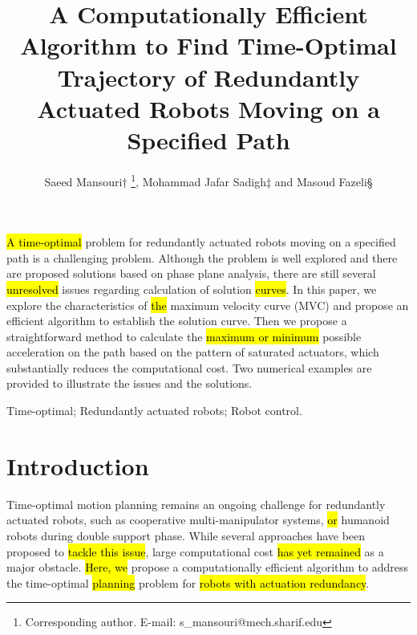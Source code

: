 \documentclass{rob}%
\begin{document}
	
	\title[Time-Optimal Trajectory of Redundantly Actuated Robots]{A Computationally Efficient Algorithm to Find Time-Optimal Trajectory of Redundantly Actuated Robots Moving on a Specified Path}
	
	\author{Saeed Mansouri$\dagger$ \thanks{Corresponding author. E-mail: s\_mansouri@mech.sharif.edu}, Mohammad Jafar Sadigh$\ddagger$ and Masoud Fazeli\S}
	
	
	\maketitle
	
	\begin{summary}
		\hl{A time-optimal} problem for redundantly actuated robots moving on a specified path is a challenging problem. Although the problem is well explored and there are proposed solutions based on phase plane analysis, there are still several \hl{unresolved} issues regarding calculation of solution \hl{curves}. In this paper, we explore the characteristics of \hl{the} maximum velocity curve (MVC) and propose an efficient algorithm to establish the solution curve. Then we propose a straightforward method to calculate the \hl{maximum or minimum} possible acceleration on the path based on the pattern of saturated actuators, which substantially reduces the computational cost. Two numerical examples are provided to illustrate the issues and the solutions.
	\end{summary}
	
	\begin{keywords}
		Time-optimal; Redundantly actuated robots; Robot control.
	\end{keywords}
	
\section{Introduction}
\label{sec:Cmpss}
Time-optimal motion planning remains an ongoing challenge for redundantly actuated robots, such as cooperative multi-manipulator systems, \hl{or} humanoid robots during double support phase. While several approaches have been proposed to \hl{tackle this issue}, large computational cost \hl{has yet remained} as a major obstacle. \hl{Here, we} propose a computationally efficient algorithm to address the time-optimal \hl{planning} problem for \hl{robots with actuation redundancy}. 
	
\end{document}
